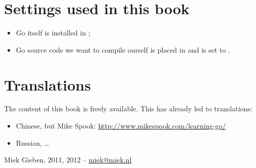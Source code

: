 \section*{Settings used in this book}
\begin{itemize}
\item Go itself is installed in  ;
\item Go source code we want to compile ourself is placed in  and
 is set to  .
\end{itemize}

\section*{Translations}
The content of this book is freely available. This has already led to translations:
\begin{itemize}
\item Chinese, but Mike Spook: \url{http://www.mikespook.com/learning-go/}
\item Russian, \ldots
\end{itemize}

\begin{flushright}
Miek Gieben, 2011, 2012 -- \url{miek@miek.nl}
\end{flushright}
